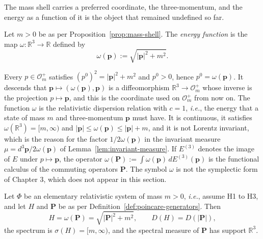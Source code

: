 The mass shell carries a preferred coordinate, the three-momentum, and the energy as a function of it is the object that remained undefined so far.

\begin{definition}\label{def:energy-function}
	Let $m>0$ be as per Proposition~\ref{prop:mass-shell}. The \emph{energy function} is the map $\omega:\mathbb{R}^3\to\mathbb{R}$ defined by
	\begin{equation*}
		\omega(\mathbf{p}):=\sqrt{|\mathbf{p}|^2+m^2}.
	\end{equation*}
\end{definition}

\begin{remark}\label{rem:energy-function}
	Every $p\in\mathcal{O}_m^+$ satisfies $(p^0)^2=|\mathbf{p}|^2+m^2$ and $p^0>0$, hence $p^0=\omega(\mathbf{p})$. It descends that $\mathbf{p}\mapsto(\omega(\mathbf{p}),\mathbf{p})$ is a diffeomorphism $\mathbb{R}^3\to\mathcal{O}_m^+$ whose inverse is the projection $p\mapsto\mathbf{p}$, and this is the coordinate used on $\mathcal{O}_m^+$ from now on. The function $\omega$ is the relativistic dispersion relation with $c=1$, \textit{i.e.}, the energy that a state of mass $m$ and three-momentum $\mathbf{p}$ must have. It is continuous, it satisfies $\omega(\mathbb{R}^3)=[m,\infty)$ and $|\mathbf{p}|\leq\omega(\mathbf{p})\leq|\mathbf{p}|+m$, and it is not Lorentz invariant, which is the reason for the factor $1/2\omega(\mathbf{p})$ in the invariant measure $\mu=d^3\mathbf{p}/2\omega(\mathbf{p})$ of Lemma~\ref{lem:invariant-measure}. If $E^{(3)}$ denotes the image of $E$ under $p\mapsto\mathbf{p}$, the operator $\omega(\mathbf{P}):=\int\omega(\mathbf{p})\,dE^{(3)}(\mathbf{p})$ is the functional calculus of the commuting operators $\mathbf{P}$. The symbol $\omega$ is not the symplectic form of Chapter 3, which does not appear in this section.
\end{remark}

\begin{corollary}\label{thm:relativistic-hamiltonian}
	Let $\Phi$ be an elementary relativistic system of mass $m>0$, \textit{i.e.}, assume H1 to H3, and let $H$ and $\mathbf{P}$ be as per Definition~\ref{def:poincare-generators}. Then
	\begin{equation}\label{eq:relativistic-hamiltonian}
		H=\omega(\mathbf{P})=\sqrt{|\mathbf{P}|^2+m^2}, \qquad D(H)=D(|\mathbf{P}|),
	\end{equation}
	the spectrum is $\sigma(H)=[m,\infty)$, and the spectral measure of $\mathbf{P}$ has support $\mathbb{R}^3$.
\end{corollary}

